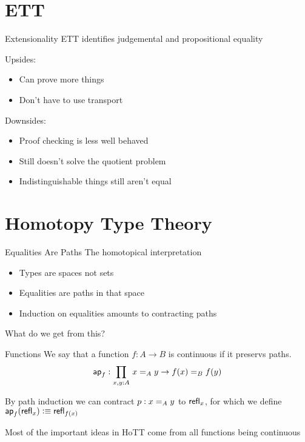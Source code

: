 \documentclass[xcolor=svgnames]{beamer}
\begin{document}
\section{ETT}

\begin{frame}{Extensionality}
  ETT identifies judgemental and propositional equality \pause

  Upsides:
  \begin{itemize}
  \item Can prove more things
  \item Don't have to use transport
  \end{itemize} \pause

  Downsides:
  \begin{itemize}
  \item Proof checking is less well behaved
  \item Still doesn't solve the quotient problem
  \item Indistinguishable things still aren't equal
  \end{itemize}
\end{frame}

\section{Homotopy Type Theory}

\begin{frame}{Equalities Are Paths}
  The homotopical interpretation
  \begin{itemize}
  \item Types are spaces not sets
  \item Equalities are paths in that space
  \item Induction on equalities amounts to contracting paths
  \end{itemize}

  What do we get from this? %
\end{frame}

\begin{frame}{Functions}
  We say that a function $f : A \to B$ is continuous if it preservs paths.
  $$ \apfunc{f} : \prd{x,y:A} x =_A y \to f(x) =_B f(y) $$

  By path induction we can contract $p : \id[A]{x}{y}$ to $\refl{x}$, for which we define
  $\apfunc{f}(\refl{x}) \defeq \refl{f(x)}$ \pause

  Most of the important ideas in HoTT come from all functions being continuous
\end{frame}
\end{document}
